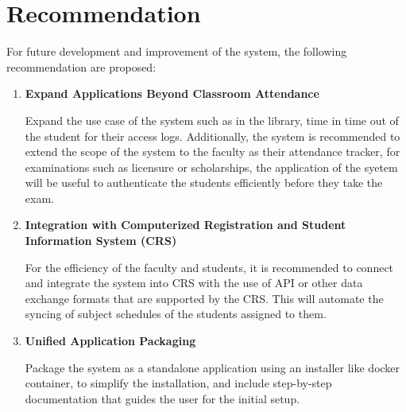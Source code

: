 \section{Recommendation}

For future development and improvement of the system, the following recommendation are proposed:

\begin{enumerate}
	\item \textbf{Expand Applications Beyond Classroom Attendance }
	
	Expand the use case of the system such as in the library, time in time out of the student for their access logs. Additionally, the system is recommended to extend the scope of the system to the faculty as their attendance tracker, for examinations such as licensure or scholarships, the application of the syetem will be useful to authenticate the students efficiently before they take the exam.

	
	\item \textbf{Integration with Computerized Registration and Student Information System (CRS)}
	
	For the efficiency of the faculty and students, it is recommended to connect and integrate the system into CRS with the use of API or other data exchange formats that are supported by the CRS. This will automate the syncing of subject schedules of the students assigned to them.
	
	\item \textbf{Unified Application Packaging}
	
	Package the system as a standalone application using an installer like docker container, to simplify the installation, and include step-by-step documentation that guides the user for the initial setup.
	
\end{enumerate}

